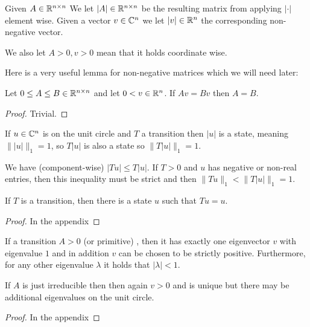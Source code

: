 \begin{mydef}
\label{def:abs}
Given $A \in \mathbb{R}^{n \times n}$ We let $|A| \in \mathbb{R}^{n \times n}$ be the resulting
matrix from applying $|\cdot|$ element wise. Given a vector $v \in \mathbb{C}^n$ we let
$|v| \in \mathbb{R}^n$ the corresponding non-negative vector.

We also let $A \gt 0, v \gt 0$ mean that it holds coordinate wise. 
\end{mydef}

Here is a very useful lemma for non-negative matrices which we will need later:
\begin{lemma}
\label{lem:eqal_by_vector}
Let $0 \leq A \leq B \in \mathbb{R}^{n \times n}$ 
and let $0 < v \in \mathbb{R}^n$.
If $Av = Bv$ then $A = B$.
\begin{proof}
Trivial.
\end{proof}
\end{lemma}

\begin{remark}
\label{remark:abs}
If $u \in \mathbb{C}^n$ is on the unit circle and $T$ a transition then
$|u|$ is a state, meaning $\||u|\|_1=1$, so $T|u|$ is also a state 
so $\|T|u|\|_1=1$.

We have (component-wise) $|Tu| \leq T|u|$. If $T>0$ and $u$ has negative or
non-real entries, then this inequality must be strict and
then $\|Tu\|_1 \lt \|T|u|\|_1 = 1$.
\end{remark}

\begin{lemma}
\label{lem:exist1}
If $T$ is a transition, then
there is a state $u$ such that $Tu = u$.
\begin{proof}
In the appendix
\end{proof}
\end{lemma}


\begin{lemma}
\label{lem:uniq1}
If a transition $A \gt 0$ (or primitive)
, then it has exactly
one eigenvector $v$ with eigenvalue $1$ and in addition $v$ can be
chosen to be strictly positive.
Furthermore, for any other eigenvalue
$\lambda$ it holds that $|\lambda| \lt 1$.

If $A$ is just irreducible then then again $v>0$ and is unique but there may be
additional eigenvalues on the unit circle.

\begin{proof}
In the appendix
\end{proof}
\end{lemma}

